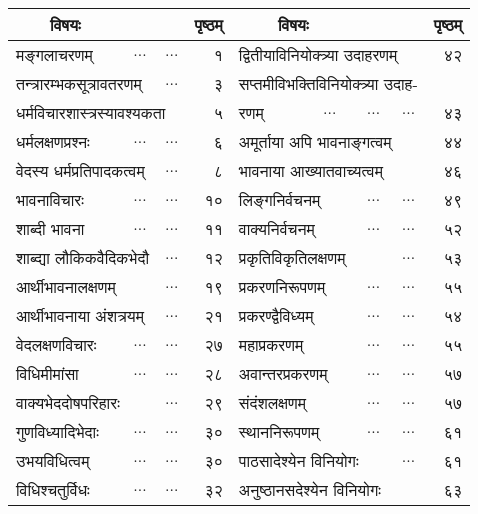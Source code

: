 \documentclass[11pt, openany]{book}
\begin{document}
\begin{longtable}{lcccr|lcccr}
 \multicolumn{2}{c}{विषयः} &&&पृष्ठम्&\multicolumn{2}{c}{विषयः} &&&पृष्ठम्\\
\endhead
\multicolumn{2}{l}{मङ्गलाचरणम्} &$\ldots$&$\ldots$&१&\multicolumn{4}{l}{द्वितीयाविनियोक्त्र्या उदाहरणम्} &४२\\
\multicolumn{3}{l}{तन्त्रारम्भकसूत्रावतरणम्} &$\ldots$&३&\multicolumn{4}{l}{सप्तमीविभक्तिविनियोक्त्र्या उदाह-} &\\
\multicolumn{4}{l}{धर्मविचारशास्त्रस्यावश्यकता}& ५ &रणम्&$\ldots$&$\ldots$&$\ldots$&४३\\
\multicolumn{2}{l}{धर्मलक्षणप्रश्नः}& $\ldots$&$\ldots$&६&\multicolumn{4}{l}{अमूर्ताया अपि भावनाङ्गत्वम्} &४४ \\
\multicolumn{3}{l}{वेदस्य धर्मप्रतिपादकत्वम्}&$\ldots$& ८&\multicolumn{4}{l}{भावनाया आख्यातवाच्यत्वम्} &४६\\
\multicolumn{2}{l}{भावनाविचारः} &$\ldots$&$\ldots$&१०&\multicolumn{2}{l}{लिङ्गनिर्वचनम्}&$\ldots$&$\ldots$&४९\\
\multicolumn{2}{l}{शाब्दी भावना} &$\ldots$&$\ldots$&११&\multicolumn{2}{l}{वाक्यनिर्वचनम्} &$\ldots$&$\ldots$&५२\\
\multicolumn{3}{l}{शाब्द्या लौकिकवैदिकभेदौ}&$\ldots$& १२&\multicolumn{3}{l}{प्रकृतिविकृतिलक्षणम्} &$\ldots$&५३\\
\multicolumn{3}{l}{आर्थीभावनालक्षणम्} &$\ldots$&१९&\multicolumn{2}{l}{प्रकरणनिरूपणम्} &$\ldots$&$\ldots$&५५\\
\multicolumn{3}{l}{आर्थीभावनाया अंशत्रयम्} &$\ldots$&२१&\multicolumn{2}{l}{प्रकरण्द्वैविध्यम्} &$\ldots$&$\ldots$&५४\\
\multicolumn{2}{l}{वेदलक्षणविचारः} &$\ldots$&$\ldots$&२७&\multicolumn{2}{l}{महाप्रकरणम्} &$\ldots$&$\ldots$&५५\\
\multicolumn{2}{l}{विधिमीमांसा} &$\ldots$&$\ldots$&२८&\multicolumn{2}{l}{अवान्तरप्रकरणम्} &$\ldots$&$\ldots$&५७\\
\multicolumn{3}{l}{वाक्यभेददोषपरिहारः} &$\ldots$&२९ &\multicolumn{2}{l}{संदंशलक्षणम्} &$\ldots$&$\ldots$&५७ \\
\multicolumn{2}{l}{गुणविध्यादिभेदाः} &$\ldots$&$\ldots$&३०&\multicolumn{2}{l}{स्थाननिरूपणम्} &$\ldots$&$\ldots$&६१\\
\multicolumn{2}{l}{उभयविधित्वम्} &$\ldots$&$\ldots$&३०&\multicolumn{3}{l}{पाठसादेश्येन विनियोगः} &$\ldots$&६१\\
\multicolumn{2}{l}{विधिश्चतुर्विधः} &$\ldots$&$\ldots$&३२&\multicolumn{4}{l}{अनुष्ठानसदेश्येन विनियोगः}&६३\\

\end{longtable}
\end{document}
